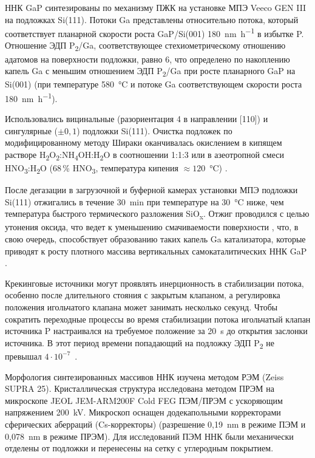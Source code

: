 ННК GaP синтезированы по механизму ПЖК на установке МПЭ Veeco GEN III на
подложках Si(111). Потоки Ga представлены относительно потока, который
соответствует планарной скорости роста GaP/Si(001)
180~\si{\nano\meter\per\hour} в избытке P. Отношение ЭДП P\textsubscript{2}/Ga,
соответствующее стехиометрическому отношению адатомов на поверхности подложки,
равно 6, что определено по накоплению капель Ga с меньшим отношением ЭДП
P\textsubscript{2}/Ga при росте планарного GaP на Si(001) (при температуре
580~\si{\degreeCelsius} и потоке Ga соответствующем скорости роста
180~\si{\nano\meter\per\hour}).

Использовались вицинальные (разориентация 4{\textdegree} в направлении [110]) и
сингулярные (\(\pm 0,1\){\textdegree}) подложки Si(111). Очистка подложек по
модифицированному методу Шираки \cite{Okumura1997, Ishizaka2019} оканчивалась
окислением в кипящем растворе
H\textsubscript{2}O\textsubscript{2}:NH\textsubscript{4}OH:H\textsubscript{2}O
в соотношении 1:1:3 или в азеотропной смеси
HNO\textsubscript{3}:H\textsubscript{2}O (68\,\% HNO\textsubscript{3},
температура кипения \(\approx 120\)~\si{\degreeCelsius}) \cite{Imamura2010}.

После дегазации в загрузочной и буферной камерах установки МПЭ подложки Si(111)
отжигались в течение 30~\si{\minute} при температуре на 30~\si{\degreeCelsius}
ниже, чем температура быстрого термического разложения SiO\textsubscript{x}.
Отжиг проводился с целью утонения оксида, что ведет к уменьшению смачиваемости
поверхности \cite{Matteini2015}, что, в свою очередь, способствует образованию
таких капель Ga катализатора, которые приводят к росту плотного массива
вертикальных самокаталитических ННК GaP \cite{Dubrovskii2012a}.

Крекинговые источники могут проявлять инерционность в стабилизации потока,
особенно после длительного стояния с закрытым клапаном, а регулировка положения
игольчатого клапана может занимать несколько секунд. Чтобы сократить переходные
процессы во время стабилизации потока игольчатый клапан источника P
настраивался на требуемое положение за 20~\si{\second} до открытия заслонки
источника. В этот период времени попадающий на подложку ЭДП P\textsubscript{2}
не превышал \(4 \cdot 10^{-7}\)~\si{\torr}.

Морфология синтезированных массивов ННК изучена методом РЭМ (Zeiss SUPRA 25).
Кристаллическая структура исследована методом ПРЭМ на микроскопе JEOL
JEM-ARM200F Cold FEG ПЭМ/ПРЭМ с ускоряющим напряжением 200~\si{\kilo\volt}.
Микроскоп оснащен додекапольными корректорами сферических аберраций
(Cs-корректоры) (разрешение 0,19~\si{\nano\meter} в режиме ПЭМ и
0,078~\si{\nano\meter} в режиме ПРЭМ). Для исследований ПЭМ ННК были
механически отделены от подложки и перенесены на сетку с углеродным покрытием.


